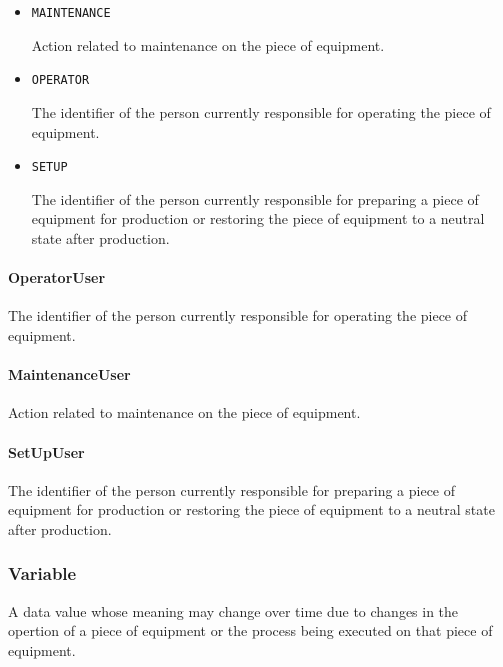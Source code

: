 \begin{itemize}

\item \texttt{MAINTENANCE}


Action related to maintenance on the piece of equipment.

\item \texttt{OPERATOR}


The identifier of the person currently responsible for operating the piece of equipment.

\item \texttt{SET\textunderscore UP}


The identifier of the person currently responsible for preparing a piece of equipment for production or restoring the piece of equipment to a neutral state after production.


\end{itemize}

\paragraph{OperatorUser}\mbox{}
\label{sec:OperatorUser}


The identifier of the person currently responsible for operating the piece of equipment.


\paragraph{MaintenanceUser}\mbox{}
\label{sec:MaintenanceUser}


Action related to maintenance on the piece of equipment.


\paragraph{SetUpUser}\mbox{}
\label{sec:SetUpUser}


The identifier of the person currently responsible for preparing a piece of equipment for production or restoring the piece of equipment to a neutral state after production.


\subsubsection{Variable}
\label{sec:Variable}



A data value whose meaning may change over time due to changes in the opertion of a piece of equipment or the process being executed on that piece of equipment.


